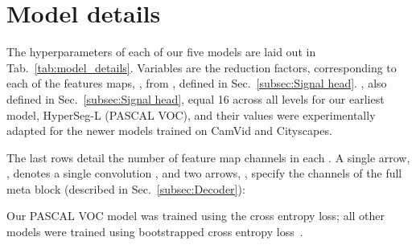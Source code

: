 \documentclass[final]{cvpr}
\begin{document}
\section{Model details}
\label{sec:Model details}
The hyperparameters of each of our five models are laid out in Tab.~\ref{tab:model_details}. Variables  are the reduction factors, corresponding to each of the features maps, , from , defined in Sec.~\ref{subsec:Signal head}. , also defined in Sec.~\ref{subsec:Signal head}, equal 16 across all levels for our earliest model, HyperSeg-L (PASCAL VOC), and their values were experimentally adapted for the newer models trained on CamVid and Cityscapes.

The last rows detail the number of feature map channels in each . A single arrow, , denotes a single  convolution , and two arrows, , specify the channels of the full meta block (described in Sec.~\ref{subsec:Decoder}): 


Our PASCAL VOC model was trained using the cross entropy loss; all other models were trained using bootstrapped cross entropy loss~\cite{reed2014training}.
\end{document}
